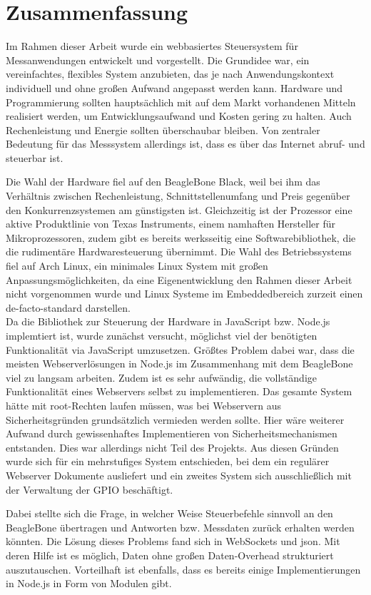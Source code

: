 \documentclass[thesis.tex]{subfiles}
\begin{document}
\chapter{Zusammenfassung}
Im Rahmen dieser Arbeit wurde ein webbasiertes Steuersystem für Messanwendungen entwickelt und vorgestellt. Die Grundidee war, ein vereinfachtes, flexibles System anzubieten, das je nach Anwendungskontext individuell und ohne großen Aufwand angepasst werden kann. Hardware und Programmierung sollten hauptsächlich mit auf dem Markt vorhandenen Mitteln realisiert werden, um Entwicklungsaufwand und Kosten gering zu halten. Auch Rechenleistung und Energie sollten überschaubar bleiben. Von zentraler Bedeutung für das Messsystem allerdings ist, dass es über das Internet abruf- und steuerbar ist.

Die Wahl der Hardware fiel auf den BeagleBone Black, weil bei ihm das Verhältnis zwischen Rechenleistung, Schnittstellenumfang und Preis gegenüber den Konkurrenzsystemen am günstigsten ist. Gleichzeitig ist der Prozessor eine aktive Produktlinie von Texas Instruments, einem namhaften Hersteller für Mikroprozessoren, zudem gibt es bereits werksseitig eine Softwarebibliothek, die die rudimentäre Hardwaresteuerung übernimmt. Die Wahl des Betriebssystems fiel auf Arch Linux, ein minimales Linux System mit großen Anpassungsmöglichkeiten, da eine Eigenentwicklung den Rahmen dieser Arbeit nicht vorgenommen wurde und Linux Systeme im Embeddedbereich zurzeit einen \gls{de-facto-standard} darstellen.\\

Da die Bibliothek zur Steuerung der Hardware in JavaScript bzw. Node.js implemtiert ist, wurde zunächst versucht, möglichst viel der benötigten Funktionalität via JavaScript umzusetzen. Größtes Problem dabei war, dass die meisten Webserverlösungen in Node.js im Zusammenhang mit dem BeagleBone viel zu langsam arbeiten. Zudem ist es sehr aufwändig,  die vollständige Funktionalität eines Webservers selbst zu implementieren. Das gesamte System hätte mit root-Rechten laufen müssen, was bei Webservern aus Sicherheitsgründen grundsätzlich vermieden werden sollte. Hier wäre weiterer Aufwand durch gewissenhaftes Implementieren von Sicherheitsmechanismen entstanden. Dies war allerdings nicht Teil des Projekts. Aus diesen Gründen wurde sich für ein mehrstufiges System entschieden, bei dem ein regulärer Webserver Dokumente ausliefert und ein zweites System sich ausschließlich mit der Verwaltung der GPIO beschäftigt.

Dabei stellte sich die Frage, in welcher Weise Steuerbefehle sinnvoll an den BeagleBone übertragen und Antworten bzw. Messdaten zurück erhalten werden könnten. Die Lösung dieses Problems fand sich in WebSockets und \gls{json}. Mit deren Hilfe ist es möglich, Daten ohne großen Daten-Overhead strukturiert auszutauschen. Vorteilhaft ist ebenfalls, dass es bereits einige Implementierungen in Node.js in Form von Modulen gibt.\\
\end{document}
